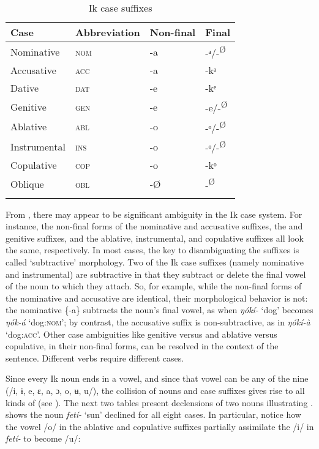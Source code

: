 \begin{table}
\caption{Ik case suffixes}
\label{tab:case:suffixes}


\begin{tabularx}{\textwidth}{XXXX}
\lsptoprule

Case & Abbreviation & Non-final & Final\\
\midrule
Nominative & \textsc{nom} & {}-a & {}-ᵃ/-\textsuperscript{Ø}\\
Accusative & \textsc{acc} & {}-a & {}-kᵃ\\
Dative & \textsc{dat} & {}-e & {}-kᵉ\\
Genitive & \textsc{gen} & {}-e & {}-e/-\textsuperscript{Ø}\\
Ablative & \textsc{abl} & {}-o & {}-ᵒ/-\textsuperscript{Ø}\\
Instrumental & \textsc{ins} & {}-o & {}-ᵒ/-\textsuperscript{Ø}\\
Copulative & \textsc{cop} & {}-o & {}-kᵒ\\
Oblique & \textsc{obl} & {}-Ø & {}-\textsuperscript{Ø}\\
\lspbottomrule
\end{tabularx}
\end{table}
From , there may appear to be significant ambiguity in the Ik case system. For instance, the non-final forms of the nominative and accusative suffixes, the  and genitive suffixes, and the ablative, instrumental, and copulative suffixes all look the same, respectively. In most cases, the key to disambiguating the suffixes is called ‘subtractive’ morphology. Two of the Ik case suffixes (namely nominative and instrumental) are subtractive in that they subtract or delete the final vowel of the noun to which they attach. So, for example, while the non-final forms of the nominative and accusative are identical, their morphological behavior is not: the nominative \{-a\} subtracts the noun’s final vowel, as when \textit{ŋókí-} ‘dog’ becomes \textit{ŋók-á} ‘dog:\textsc{nom}’; by contrast, the accusative suffix is non-subtractive, as in \textit{ŋókí-à} ‘dog:\textsc{acc}’. Other case ambiguities like genitive versus  and ablative versus copulative, in their non-final forms, can be resolved in the context of the sentence. Different verbs require different cases.

Since every Ik noun ends in a vowel, and since that vowel can be any of the nine (/i, ɨ, e, ɛ, a, ɔ, o, ʉ, u/), the collision of nouns and case suffixes gives rise to all kinds of  (see ). The next two tables present declensions of two nouns illustrating .  shows the noun \textit{fetí-} ‘sun’ declined for all eight cases. In particular, notice how the vowel /o/ in the ablative and copulative suffixes partially assimilate the /i/ in \textit{fetí-} to become /u/:


